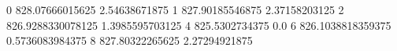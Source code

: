0 828.07666015625 2.54638671875
1 827.90185546875 2.37158203125
2 826.9288330078125 1.3985595703125
4 825.5302734375 0.0
6 826.1038818359375 0.5736083984375
8 827.80322265625 2.27294921875
